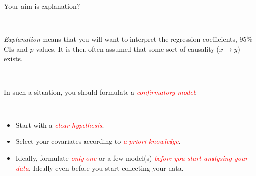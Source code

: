 \documentclass[10pt,ignorenonframetext,]{beamer}
\begin{document}
\begin{frame}

\begin{block}{Your aim is explanation?}

\(~\)

\emph{Explanation} means that you will want to interpret the regression
coefficients, 95\% CIs and \(p\)-values. It is then often assumed that
some sort of causality (\(x\rightarrow y\)) exists.

\(~\)

In such a situation, you should formulate a
\emph{\textcolor{red}{confirmatory model}}:

\(~\)

\begin{itemize}
\item
  Start with a \emph{\textcolor{red}{clear hypothesis}}. \vspace{2mm}
\item
  Select your covariates according to
  \emph{\textcolor{red}{a priori knowledge}}. \vspace{2mm}
\item
  Ideally, formulate \emph{\textcolor{red}{only one}} or a few model(s)
  \emph{\textcolor{red}{before you start analysing your data}}. Ideally
  even before you start collecting your data.
\end{itemize}

\end{block}

\end{frame}
\end{document}
